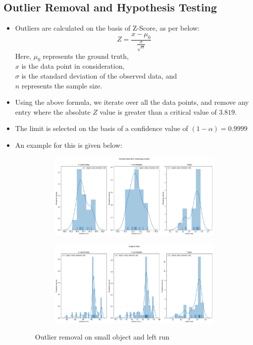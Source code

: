 \documentclass[10pt,a4paper]{article}
\begin{document}
					\subsection{Outlier Removal and Hypothesis Testing}
						\begin{itemize}
							\item Outliers are calculated on the basis of Z-Score, as per below:
							$$Z = \frac{x-\mu_0}{\frac{\sigma}{\sqrt{n}}}$$
							Here, $\mu_0$ represents the ground truth,\\
							$x$ is the data point in consideration,\\
							$\sigma$ is the standard deviation of the observed data, and\\
							$n$ represents the sample size.
							\item Using the above formula, we iterate over all the data points, and remove any entry where the absolute $Z$ value is greater than a critical value of $3.819$.
							\item The limit is selected on the basis of a confidence value of $(1-\alpha) = 0.9999$ \cite{hypothesisTesting}							
							\item An example for this is given below:
								\begin{figure}[H]
									\begin{subfigure}{\textwidth}
										\centering
										\includegraphics[width=\linewidth]{img/filtered/small_left_filtered.png}				
									\end{subfigure}
									\begin{subfigure}{\textwidth}
										\centering
										\includegraphics[width=\linewidth]{img/filtered/small_left_org.png}
									\end{subfigure}
									\caption{Outlier removal on small object and left run}
								\end{figure}
						\end{itemize}
						
\end{document}
